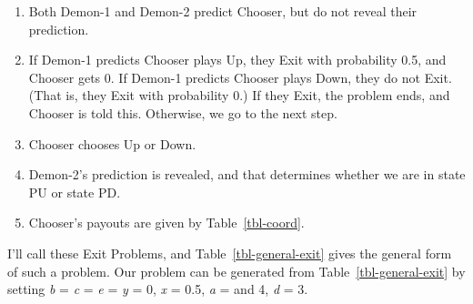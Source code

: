 \documentclass[
  12pt,
  letterpaper,
  DIV=11,
  numbers=noendperiod]{scrreprt}
\providecommand{\tightlist}{%
  \setlength{\itemsep}{0pt}\setlength{\parskip}{0pt}}\usepackage{longtable,booktabs,array}
\begin{document}
\begin{enumerate}
\def\labelenumi{\arabic{enumi}.}
\tightlist
\item
  Both Demon-1 and Demon-2 predict Chooser, but do not reveal their
  prediction.
\item
  If Demon-1 predicts Chooser plays Up, they Exit with probability 0.5,
  and Chooser gets 0. If Demon-1 predicts Chooser plays Down, they do
  not Exit. (That is, they Exit with probability 0.) If they Exit, the
  problem ends, and Chooser is told this. Otherwise, we go to the next
  step.
\item
  Chooser chooses Up or Down.
\item
  Demon-2's prediction is revealed, and that determines whether we are
  in state PU or state PD.
\item
  Chooser's payouts are given by Table~\ref{tbl-coord}.
\end{enumerate}

I'll call these Exit Problems, and Table~\ref{tbl-general-exit} gives
the general form of such a problem. Our problem can be generated from
Table~\ref{tbl-general-exit} by setting \emph{b} = \emph{c} = \emph{e} =
\emph{y} = 0, \emph{x} = 0.5, \emph{a} = and 4, \emph{d} = 3.

\begin{table}

\caption{\label{tbl-general-exit}The abstract form of an Exit Problem.}

\begin{minipage}[t]{0.50\linewidth}



\end{minipage}%
%
\begin{minipage}[t]{0.50\linewidth}



\end{minipage}%

\end{table}%
\end{document}
